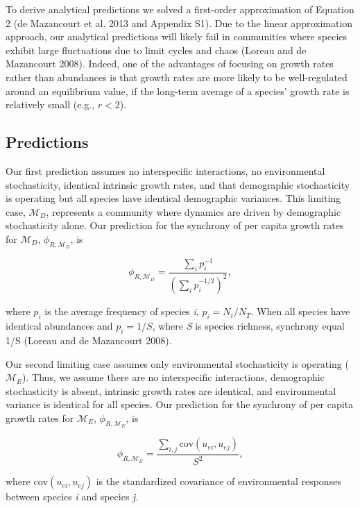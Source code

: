 \documentclass[12pt,]{article}
\begin{document}
To derive analytical predictions we solved a first-order approximation
of Equation 2 ({{de Mazancourt}} et al. 2013 and Appendix S1). Due to
the linear approximation approach, our analytical predictions will
likely fail in communities where species exhibit large fluctuations due
to limit cycles and chaos (Loreau and {{de Mazancourt}} 2008). Indeed,
one of the advantages of focusing on growth rates rather than abundances
is that growth rates are more likely to be well-regulated around an
equilibrium value, if the long-term average of a species' growth rate is
relatively small (e.g., \(r < 2\)).

\subsection{Predictions}

Our first prediction assumes no interspecific interactions, no
environmental stochasticity, identical intrinsic growth rates, and that
demographic stochasticity is operating but all species have identical
demographic variances. This limiting case, \(\mathcal{M}_{D}\),
represents a community where dynamics are driven by demographic
stochasticity alone. Our prediction for the synchrony of per capita
growth rates for \(\mathcal{M}_{D}\), \(\phi_{R,\mathcal{M}_{D}}\), is

\begin{equation}
\phi_{R,\mathcal{M}_{D}} = \frac{\sum_i p_i^{-1}}{\left(\sum_i p_i^{-1/2} \right)^2},
\end{equation}

\noindent where \(p_i\) is the average frequency of species \emph{i},
\(p_i = N_i/N_T\). When all species have identical abundances and
\(p_i = 1/S\), where \emph{S} is species richness, synchrony equal 1/S
(Loreau and {{de Mazancourt}} 2008).

Our second limiting case assumes only environmental stochasticity is
operating (\(\mathcal{M}_{E}\)). Thus, we assume there are no
interspecific interactions, demographic stochasticity is absent,
intrinsic growth rates are identical, and environmental variance is
identical for all species. Our prediction for the synchrony of per
capita growth rates for \(\mathcal{M}_{E}\),
\(\phi_{R,\mathcal{M}_{E}}\), is

\begin{equation}
\phi_{R,\mathcal{M}_{E}} = \frac{\sum_{i,j}\text{cov}(u_{ei},u_{ej})}{S^2},
\end{equation}

\noindent{} where \(\text{cov}(u_{ei},u_{ej})\) is the standardized
covariance of environmental responses between species \emph{i} and
species \emph{j}.
\end{document}
